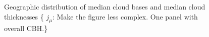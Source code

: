\documentclass[amt,manuscript]{copernicus}\usepackage[]{graphicx}\usepackage[]{color}
\newcommand{\hlnum}[1]{\textcolor[rgb]{0.686,0.059,0.569}{#1}}%
\newcommand\comment[2]{\{\hlnum{ \textit{#1}: #2}\}}
\newcommand\commentjm[1]{\comment{$j_\mu$}{#1}}
\begin{document}
\begin{figure}
  \centering
  \caption{Geographic distribution of median cloud bases and median cloud
    thicknesses \commentjm{Make the figure less complex.  One panel with overall
    CBH.}}
  \label{fig:geo}
\end{figure}
\end{document}
